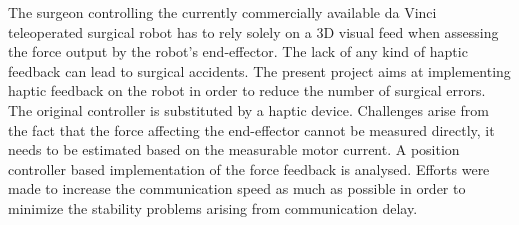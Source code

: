 The surgeon controlling the currently commercially available da Vinci teleoperated surgical robot has to rely solely on a 3D visual feed when assessing the force output by the robot's end-effector. The lack of any kind of haptic feedback can lead to surgical accidents. The present project aims at implementing haptic feedback on the robot in order to reduce the number of surgical errors.
The original controller is substituted by a haptic device.
Challenges arise from the fact that the force affecting the end-effector cannot be measured directly, it needs to be estimated based on the measurable motor current. A position controller based implementation of the force feedback is analysed.
Efforts were made to increase the communication speed as much as possible in order to minimize the stability problems arising from communication delay.
